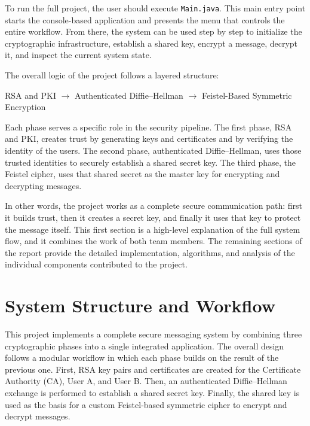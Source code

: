 \documentclass[12pt]{article}
\begin{document}
To run the full project, the user should execute \texttt{Main.java}. This main entry point starts the console-based application and presents the menu that controls the entire workflow. From there, the system can be used step by step to initialize the cryptographic infrastructure, establish a shared key, encrypt a message, decrypt it, and inspect the current system state.

The overall logic of the project follows a layered structure:
\begin{center}
RSA and PKI $\rightarrow$ Authenticated Diffie--Hellman $\rightarrow$ Feistel-Based Symmetric Encryption
\end{center}

Each phase serves a specific role in the security pipeline. The first phase, RSA and PKI, creates trust by generating keys and certificates and by verifying the identity of the users. The second phase, authenticated Diffie--Hellman, uses those trusted identities to securely establish a shared secret key. The third phase, the Feistel cipher, uses that shared secret as the master key for encrypting and decrypting messages.

In other words, the project works as a complete secure communication path: first it builds trust, then it creates a secret key, and finally it uses that key to protect the message itself. This first section is a high-level explanation of the full system flow, and it combines the work of both team members. The remaining sections of the report provide the detailed implementation, algorithms, and analysis of the individual components contributed to the project.



\section{System Structure and Workflow}
\label{sec:structure}

This project implements a complete secure messaging system by combining three cryptographic phases into a single integrated application. The overall design follows a modular workflow in which each phase builds on the result of the previous one. First, RSA key pairs and certificates are created for the Certificate Authority (CA), User A, and User B. Then, an authenticated Diffie--Hellman exchange is performed to establish a shared secret key. Finally, the shared key is used as the basis for a custom Feistel-based symmetric cipher to encrypt and decrypt messages.
\end{document}
